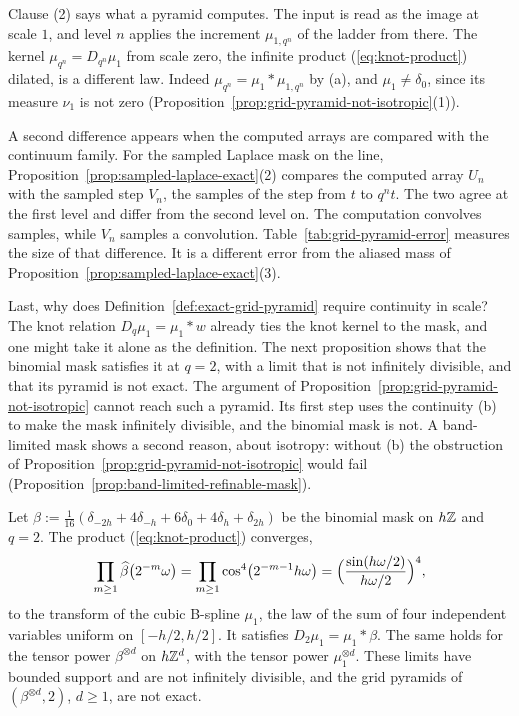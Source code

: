 Clause (2) says what a pyramid computes. The input is read as the image at scale $1$, and level $n$
applies the increment $\mu_{1,q^n}$ of the ladder from there. The kernel $\mu_{q^n} = D_{q^n}\mu_1$
from scale zero, the infinite product (\ref{eq:knot-product}) dilated, is a different law. Indeed
$\mu_{q^n} = \mu_1 * \mu_{1,q^n}$ by (a), and $\mu_1 \ne \delta_0$, since its \Levy{} measure
$\nu_1$ is not zero (Proposition~\ref{prop:grid-pyramid-not-isotropic}(1)).

A second difference appears when the computed arrays are compared with the continuum family. For the
sampled Laplace mask on the line, Proposition~\ref{prop:sampled-laplace-exact}(2) compares the
computed array $U_n$ with the sampled step $V_n$, the samples of the \Matern{} step from $t$ to
$q^nt$. The two agree at the first level and differ from the second level on. The computation
convolves samples, while $V_n$ samples a convolution. Table~\ref{tab:grid-pyramid-error} measures
the size of that difference. It is a different error from the aliased mass of
Proposition~\ref{prop:sampled-laplace-exact}(3).

Last, why does Definition~\ref{def:exact-grid-pyramid} require continuity in scale? The knot
relation $D_q\mu_1 = \mu_1 * w$ already ties the knot kernel to the mask, and one might take it
alone as the definition. The next proposition shows that the binomial mask satisfies it at
$q = 2$, with a limit that is not infinitely divisible, and that its pyramid is not exact. The
argument of Proposition~\ref{prop:grid-pyramid-not-isotropic} cannot reach such a pyramid. Its
first step uses the continuity (b) to make the mask infinitely divisible, and the binomial mask is
not. A band-limited mask shows a second reason, about isotropy: without (b) the obstruction of
Proposition~\ref{prop:grid-pyramid-not-isotropic} would fail
(Proposition~\ref{prop:band-limited-refinable-mask}).

\begin{proposition}
\label{prop:binomial-knot-relation}

Let $\beta := \tfrac{1}{16}(\delta_{-2h} + 4\delta_{-h} + 6\delta_0 + 4\delta_h + \delta_{2h})$ be the
binomial mask on $h\mathbb{Z}$ and $q = 2$. The product (\ref{eq:knot-product}) converges,
\[
\prod_{m \ge 1}\widehat{\beta}\bigl(2^{-m}\omega\bigr) = \prod_{m \ge 1}\cos^4\bigl(2^{-m-1}h\omega\bigr)
= \Bigl(\frac{\sin(h\omega/2)}{h\omega/2}\Bigr)^4 ,
\]
to the transform of the cubic B-spline $\mu_1$, the law of the sum of four independent variables
uniform on $[-h/2, h/2]$. It satisfies $D_2\mu_1 = \mu_1 * \beta$. The same holds for the tensor
power $\beta^{\otimes d}$ on $h\mathbb{Z}^d$, with the tensor power $\mu_1^{\otimes d}$. These limits have
bounded support and are not infinitely divisible, and the grid pyramids of $(\beta^{\otimes d}, 2)$,
$d \ge 1$, are not exact.
\end{proposition}

